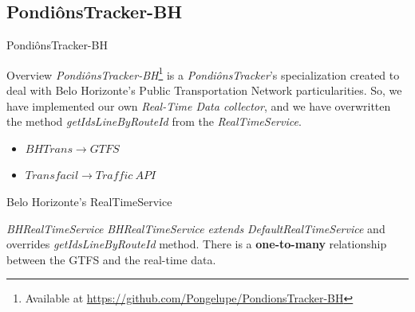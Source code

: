\documentclass[xcolor=dvipsnames,table]{beamer}
\begin{document}
\subsection{PondiônsTracker-BH}
\begin{frame}{PondiônsTracker-BH}
        \begin{block}{Overview}
                \textit{PondiônsTracker-BH}\footnote{Available at \url{https://github.com/Pongelupe/PondionsTracker-BH}} is a \textit{PondiônsTracker}'s specialization created to
                deal with Belo Horizonte's Public Transportation Network particularities. So, we have implemented our own \textit{Real-Time Data collector}, and we have overwritten the method \textit{getIdsLineByRouteId} from the 
                \textit{RealTimeService}.
                \begin{itemize}
                        \item $BHTrans \rightarrow GTFS$
                        \item $Transfacil \rightarrow Traffic\ API$
                \end{itemize}
        \end{block}
\end{frame}
\begin{frame}{Belo Horizonte’s RealTimeService}
        \begin{block}{\textit{BHRealTimeService}}
                \textit{BHRealTimeService} {\em extends} \textit{DefaultRealTimeService} and overrides \textit{getIdsLineByRouteId} method. There is a \textbf{one-to-many} relationship between the GTFS and the real-time data.
        \end{block}
\end{frame}
\end{document}
